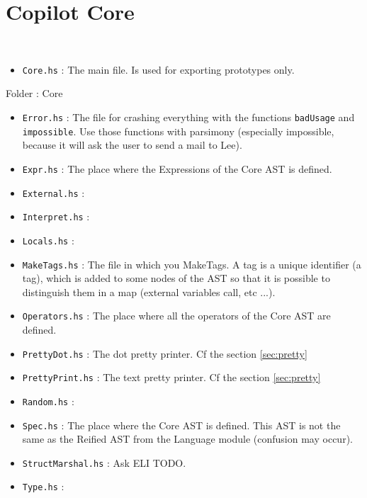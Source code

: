 \section{Copilot Core}~\label{sec:core}





\begin{itemize}
	\item \texttt{Core.hs} : The main file. Is used for exporting prototypes only.
\end{itemize}

Folder : Core
\begin{itemize}
	\item \texttt{Error.hs} : The file for crashing everything with the functions \texttt{badUsage} and \texttt{impossible}. Use those functions with parsimony (especially impossible, because it will ask the user to send a mail to Lee).
	\item \texttt{Expr.hs} : The place where the Expressions of the Core AST is defined. 
	\item \texttt{External.hs} :
	\item \texttt{Interpret.hs} :
	\item \texttt{Locals.hs} :
	\item \texttt{MakeTags.hs} : The file in which you MakeTags. A tag is a unique identifier (a tag), which is added to some nodes of the AST so that it is possible to distinguish them in a map (external variables call, etc ...).
	\item \texttt{Operators.hs} : The place where all the operators of the Core AST are defined.
	\item \texttt{PrettyDot.hs} : The dot pretty printer. Cf the section \ref{sec:pretty}
	\item \texttt{PrettyPrint.hs} : The text pretty printer. Cf the section \ref{sec:pretty}
	\item \texttt{Random.hs} :
	\item \texttt{Spec.hs} : The place where the Core AST is defined. This AST is not the same as the Reified AST from the Language module (confusion may occur).
	\item \texttt{StructMarshal.hs} : Ask ELI TODO.
	\item \texttt{Type.hs} : 
\end{itemize}

